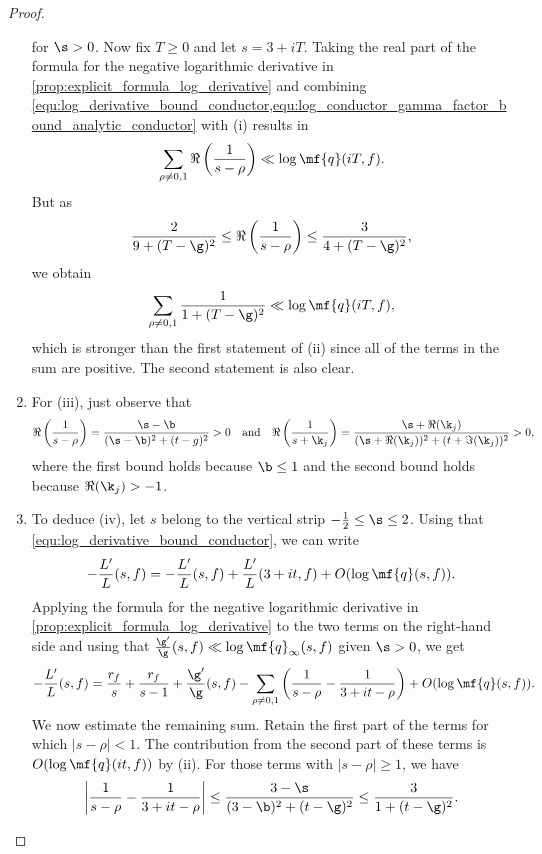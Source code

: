 \begin{proof}
\begin{enumerate}[label=(\roman*)]
\begin{equation}
        \end{equation}
        for $\s > 0$. Now fix $T \ge 0$ and let $s = 3+iT$. Taking the real part of the formula for the negative logarithmic derivative in \cref{prop:explicit_formula_log_derivative} and combining \cref{equ:log_derivative_bound_conductor,equ:log_conductor_gamma_factor_bound_analytic_conductor} with (i) results in
        \[
          \sum_{\rho \neq 0,1}\Re\left(\frac{1}{s-\rho}\right) \ll \log{\mf{q}(iT,f)}.
        \]
        But as
        \[
          \frac{2}{9+(T-\g)^{2}} \le \Re\left(\frac{1}{s-\rho}\right) \le \frac{3}{4+(T-\g)^{2}},
        \]
        we obtain
        \begin{equation}\label{equ_sum_of_nontrivial_zeros_log_analytic_conductor_bound}
          \sum_{\rho \neq 0,1}\frac{1}{1+(T-\g)^{2}} \ll \log{\mf{q}(iT,f)},
        \end{equation}
        which is stronger than the first statement of (ii) since all of the terms in the sum are positive. The second statement is also clear.
        \item For (iii), just observe that
        \[
          \Re\left(\frac{1}{s-\rho}\right) = \frac{\s-\b}{(\s-\b)^{2}+(t-
          g)^{2}} > 0 \quad \text{and} \quad \Re\left(\frac{1}{s+\k_{j}}\right) = \frac{\s+\Re(\k_{j})}{(\s+\Re(\k_{j}))^{2}+(t+\Im(\k_{j}))^{2}} > 0,
        \]
        where the first bound holds because $\b \le 1$ and the second bound holds because $\Re(\k_{j}) > -1$.
        \item To deduce (iv), let $s$ belong to the vertical strip $-\frac{1}{2} \le \s \le 2$. Using that \cref{equ:log_derivative_bound_conductor}, we can write
        \[
          -\frac{L'}{L}(s,f) = -\frac{L'}{L}(s,f)+\frac{L'}{L}(3+it,f)+O(\log{\mf{q}(s,f)}).
        \]
        Applying the formula for the negative logarithmic derivative in \cref{prop:explicit_formula_log_derivative} to the two terms on the right-hand side and using that $\frac{\g'}{\g}(s,f) \ll \log{\mf{q}_{\infty}(s,f)}$ given $\s > 0$, we get
        \[
          -\frac{L'}{L}(s,f) = \frac{r_{f}}{s}+\frac{r_{f}}{s-1}+\frac{\g'}{\g}(s,f)-\sum_{\rho \neq 0,1}\left(\frac{1}{s-\rho}-\frac{1}{3+it-\rho}\right)+O(\log{\mf{q}(s,f)}).
        \]
        We now estimate the remaining sum. Retain the first part of the terms for which $|s-\rho| < 1$. The contribution from the second part of these terms is $O(\log{\mf{q}(it,f)})$ by (ii). For those terms with $|s-\rho| \ge 1$, we have
        \[
          \left|\frac{1}{s-\rho}-\frac{1}{3+it-\rho}\right| \le \frac{3-\s}{(3-\b)^{2}+(t-\g)^{2}} \le \frac{3}{1+(t-\g)^{2}}.
\]
\end{enumerate}
\end{proof}

